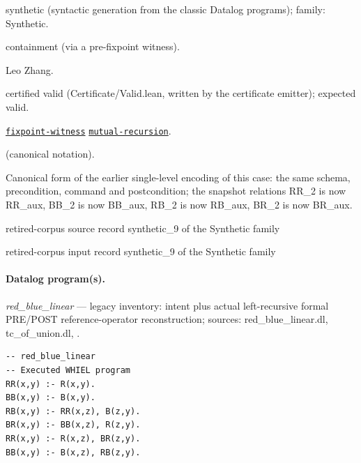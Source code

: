 \documentclass[10pt]{article}
\begin{document}
\begin{description}[leftmargin=2.6cm,style=nextline,itemsep=1pt]

\item[Category] synthetic (syntactic generation from the classic Datalog programs); family: Synthetic.

\item[Kind] containment (via a pre-fixpoint witness).

\item[Contributors] Leo Zhang.

\item[Status] certified valid (Certificate/Valid.lean, written by the certificate emitter); expected valid.

\item[Tags] \hyperref[tag:fixpoint-witness]{\texttt{fixpoint-witness}} \hyperref[tag:mutual-recursion]{\texttt{mutual-recursion}}.

\item[Input]  (canonical notation).

\item[Summary] Canonical form of the earlier single-level encoding of this case: the same schema, precondition, command and postcondition; the snapshot relations RR\_2 is now RR\_aux, BB\_2 is now BB\_aux, RB\_2 is now RB\_aux, BR\_2 is now BR\_aux.

\item[Sources] {\raggedright retired-corpus source record synthetic\_9 of the Synthetic family \par retired-corpus input record synthetic\_9 of the Synthetic family\par}

\end{description}

\paragraph{Datalog program(s).}

{\raggedright\textit{red\_blue\_linear} --- legacy inventory:  intent plus actual left-recursive formal PRE/POST reference-operator reconstruction; sources: red\_blue\_linear.dl, tc\_of\_union.dl, .\par}

\begin{Verbatim}[fontsize=\scriptsize,breaklines=true,breakanywhere=true,frame=single,framesep=1.5mm]
-- red_blue_linear
-- Executed WHIEL program
RR(x,y) :- R(x,y).
BB(x,y) :- B(x,y).
RB(x,y) :- RR(x,z), B(z,y).
BR(x,y) :- BB(x,z), R(z,y).
RR(x,y) :- R(x,z), BR(z,y).
BB(x,y) :- B(x,z), RB(z,y).
\end{Verbatim}
\end{document}
